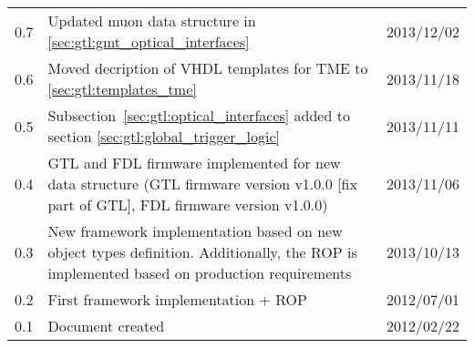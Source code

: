 \begin{longtable}{|c|p{}|c|}
0.7 & Updated muon data structure in \ref{sec:gtl:gmt_optical_interfaces} & 2013/12/02\\
0.6 & Moved decription of VHDL templates for TME to \ref{sec:gtl:templates_tme} & 2013/11/18\\
0.5 & Subsection~\ref{sec:gtl:optical_interfaces} added to section \ref{sec:gtl:global_trigger_logic} & 2013/11/11\\
0.4 & GTL and FDL firmware implemented for new data structure (GTL firmware version v1.0.0 [fix part of GTL], FDL firmware version v1.0.0) & 2013/11/06\\
0.3 & New framework implementation based on new object types definition. Additionally, the ROP is implemented based on production requirements & 2013/10/13\\
0.2 & First framework implementation + ROP  & 2012/07/01\\
0.1 & Document created & 2012/02/22\\
\hline
\end{longtable}

\clearpage{}
